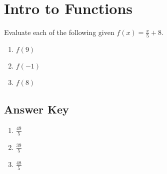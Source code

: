 \chapter{Intro to Functions}

Evaluate each of the following given $f(x) = \frac{x}{5}+8$.
\begin{multicols}{3}
\begin{enumerate}
	\item $f(9)$
	\item $f(-1)$
	\item $f(8)$
\end{enumerate}	\setcounter{Review}{\value{enumi}}
\end{multicols}

\newpage

\section{Answer Key}

\begin{enumerate}
	\item $\frac{49}{5}$
    \item $\frac{39}{5}$
    \item $\frac{48}{5}$
\end{enumerate}
